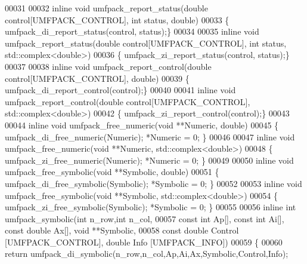 \begin{DoxyCode}
00031 
00032 \textcolor{keyword}{inline} \textcolor{keywordtype}{void} umfpack\_report\_status(\textcolor{keywordtype}{double} control[UMFPACK\_CONTROL], \textcolor{keywordtype}{int} status, \textcolor{keywordtype}{double})
00033 \{ umfpack\_di\_report\_status(control, status);\}
00034 
00035 \textcolor{keyword}{inline} \textcolor{keywordtype}{void} umfpack\_report\_status(\textcolor{keywordtype}{double} control[UMFPACK\_CONTROL], \textcolor{keywordtype}{int} status, std::complex<double>)
00036 \{ umfpack\_zi\_report\_status(control, status);\}
00037 
00038 \textcolor{keyword}{inline} \textcolor{keywordtype}{void} umfpack\_report\_control(\textcolor{keywordtype}{double} control[UMFPACK\_CONTROL], \textcolor{keywordtype}{double})
00039 \{ umfpack\_di\_report\_control(control);\}
00040 
00041 \textcolor{keyword}{inline} \textcolor{keywordtype}{void} umfpack\_report\_control(\textcolor{keywordtype}{double} control[UMFPACK\_CONTROL], std::complex<double>)
00042 \{ umfpack\_zi\_report\_control(control);\}
00043 
00044 \textcolor{keyword}{inline} \textcolor{keywordtype}{void} umfpack\_free\_numeric(\textcolor{keywordtype}{void} **Numeric, \textcolor{keywordtype}{double})
00045 \{ umfpack\_di\_free\_numeric(Numeric); *Numeric = 0; \}
00046 
00047 \textcolor{keyword}{inline} \textcolor{keywordtype}{void} umfpack\_free\_numeric(\textcolor{keywordtype}{void} **Numeric, std::complex<double>)
00048 \{ umfpack\_zi\_free\_numeric(Numeric); *Numeric = 0; \}
00049 
00050 \textcolor{keyword}{inline} \textcolor{keywordtype}{void} umfpack\_free\_symbolic(\textcolor{keywordtype}{void} **Symbolic, \textcolor{keywordtype}{double})
00051 \{ umfpack\_di\_free\_symbolic(Symbolic); *Symbolic = 0; \}
00052 
00053 \textcolor{keyword}{inline} \textcolor{keywordtype}{void} umfpack\_free\_symbolic(\textcolor{keywordtype}{void} **Symbolic, std::complex<double>)
00054 \{ umfpack\_zi\_free\_symbolic(Symbolic); *Symbolic = 0; \}
00055 
00056 \textcolor{keyword}{inline} \textcolor{keywordtype}{int} umfpack\_symbolic(\textcolor{keywordtype}{int} n\_row,\textcolor{keywordtype}{int} n\_col,
00057                             \textcolor{keyword}{const} \textcolor{keywordtype}{int} Ap[], \textcolor{keyword}{const} \textcolor{keywordtype}{int} Ai[], \textcolor{keyword}{const} \textcolor{keywordtype}{double} Ax[], \textcolor{keywordtype}{void} **Symbolic,
00058                             \textcolor{keyword}{const} \textcolor{keywordtype}{double} Control [UMFPACK\_CONTROL], \textcolor{keywordtype}{double} Info [UMFPACK\_INFO])
00059 \{
00060   \textcolor{keywordflow}{return} umfpack\_di\_symbolic(n\_row,n\_col,Ap,Ai,Ax,Symbolic,Control,Info);

\end{DoxyCode}
